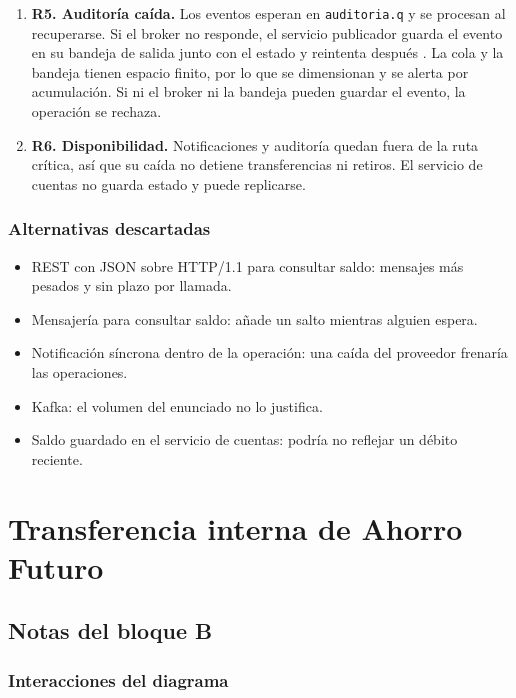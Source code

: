 \documentclass[12pt,a4paper]{article}
\begin{document}
\begin{enumerate}
    \item \textbf{R5. Auditoría caída.}
    Los eventos esperan en \texttt{auditoria.q} y se procesan al recuperarse. Si el broker no responde, el servicio publicador guarda el evento en su bandeja de salida junto con el estado y reintenta después \cite{awsoutbox}. La cola y la bandeja tienen espacio finito, por lo que se dimensionan y se alerta por acumulación. Si ni el broker ni la bandeja pueden guardar el evento, la operación se rechaza.

    \item \textbf{R6. Disponibilidad.}
    Notificaciones y auditoría quedan fuera de la ruta crítica, así que su caída no detiene transferencias ni retiros. El servicio de cuentas no guarda estado y puede replicarse.
\end{enumerate}

\subsubsection{Alternativas descartadas}

\begin{itemize}
    \item REST con JSON sobre HTTP/1.1 para consultar saldo: mensajes más pesados y sin plazo por llamada.
    \item Mensajería para consultar saldo: añade un salto mientras alguien espera.
    \item Notificación síncrona dentro de la operación: una caída del proveedor frenaría las operaciones.
    \item Kafka: el volumen del enunciado no lo justifica.
    \item Saldo guardado en el servicio de cuentas: podría no reflejar un débito reciente.
\end{itemize}

\section{Transferencia interna de Ahorro Futuro}

\subsection{Notas del bloque B}

\subsubsection{Interacciones del diagrama}
\end{document}
